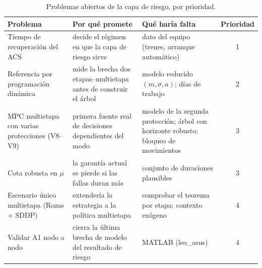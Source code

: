 \begin{table}[H]\centering\scriptsize\setlength{\tabcolsep}{3pt}
\begin{tabularx}{\linewidth}{@{}>{\raggedright\arraybackslash}p{36mm} Y >{\raggedright\arraybackslash}p{36mm} c@{}}\toprule
Problema & Por qué promete & Qué haría falta & Prioridad\\\midrule
Tiempo de recuperación del ACS & decide el régimen en que la capa de riesgo sirve & dato del equipo (trenes, arranque automático) & 1\\
Referencia por programación dinámica & mide la brecha dos etapas--multietapa antes de construir el árbol & modelo reducido $(m,\sigma,a)$; días de trabajo & 2\\
MPC multietapa con varias protecciones (V8--V9) & primera fuente real de decisiones dependientes del modo & modelo de la segunda protección; árbol con horizonte robusto; bloqueo de movimientos & 3\\
Cota robusta en $\mu$ & la garantía actual se pierde si las fallas duran más & conjunto de duraciones plausibles & 3\\
Escenario único multietapa (Rozas + SDDP) & extendería la estrategia a la política multietapa & comprobar el teorema por etapa; contexto exógeno & 4\\
Validar A1 nodo a nodo & cierra la última brecha de modelo del resultado de riesgo & MATLAB (leo\_asus) & 4\\\bottomrule
\end{tabularx}
\caption{Problemas abiertos de la capa de riesgo, por prioridad.}
\label{tab:riesgo-futuro}
\end{table}

